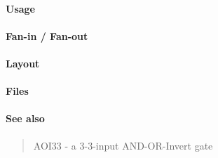 \paragraph{Usage}

\paragraph{Fan-in / Fan-out}

\paragraph{Layout}

\paragraph{Files}

\paragraph{See also}
\begin{quote}
    AOI33 - a 3-3-input AND-OR-Invert gate
\end{quote}
